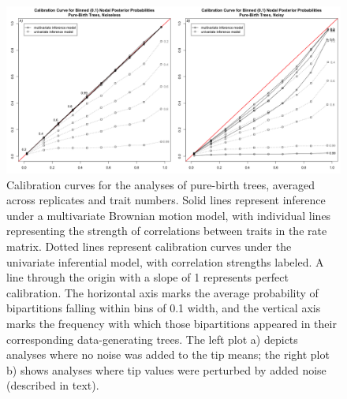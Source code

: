 \documentclass[10pt, twocolumn, twoside]{article}
\begin{document}
\begin{figure}[h]
\centering
\includegraphics[width=\textwidth]{figures/calibrationCurvePBT.png}
\caption[Calibration Curves for the Brownian Motion Simulation Study, Idealized Conditions]{Calibration curves for the analyses of pure-birth trees, averaged across replicates and trait numbers. Solid lines represent inference under a multivariate Brownian motion model, with individual lines representing the strength of correlations between traits in the rate matrix. Dotted lines represent calibration curves under the univariate inferential model, with correlation strengths labeled. A line through the origin with a slope of 1 represents perfect calibration. The horizontal axis marks the average probability of bipartitions falling within bins of 0.1 width, and the vertical axis marks the frequency with which those bipartitions appeared in their corresponding data-generating trees. The left plot a) depicts analyses where no noise was added to the tip means; the right plot b) shows analyses where tip values were perturbed by added noise (described in text).
\label{overflow}
\label{fig:calibrationCurvePBT}
}
\end{figure}
\end{document}
